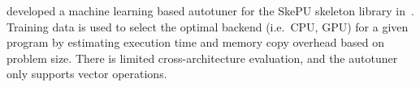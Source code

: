 


\citeauthor{Dastgeer2011} developed a machine learning based autotuner
for the SkePU skeleton library in~\cite{Dastgeer2011}. Training data
is used to select the optimal backend (i.e.\ CPU, GPU) for a given
program by estimating execution time and memory copy overhead based on
problem size. There is limited cross-architecture evaluation, and the
autotuner only supports vector operations.















